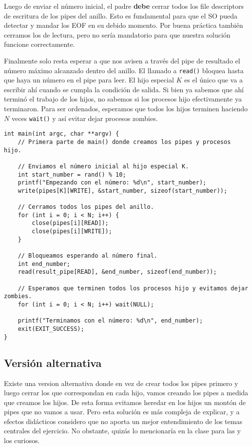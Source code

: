 Luego de enviar el número inicial, el padre \textbf{debe} cerrar todos los file descriptors de escritura de los pipes del anillo. Esto es fundamental para que el SO pueda detectar y mandar los EOF en su debido momento. Por buena práctica también cerramos los de lectura, pero no sería mandatorio para que nuestra solución funcione correctamente.

Finalmente solo resta esperar a que nos avisen a través del pipe de resultado el número máximo alcanzado dentro del anillo. El llamado a \texttt{read()} bloquea hasta que haya un número en el pipe para leer. El hijo especial $K$ es el único que va a escribir ahí cuando se cumpla la condición de salida. Si bien ya sabemos que ahí terminó el trabajo de los hijos, no sabemos si los procesos hijo efectivamente ya terminaron. Para ser ordenados, esperamos que todos los hijos terminen haciendo $N$ veces \texttt{wait()} y así evitar dejar procesos zombies.

\begin{verbatim}
int main(int argc, char **argv) {
    // Primera parte de main() donde creamos los pipes y procesos hijo.

    // Enviamos el número inicial al hijo especial K.
    int start_number = rand() % 10;
    printf("Empezando con el número: %d\n", start_number);
    write(pipes[K][WRITE], &start_number, sizeof(start_number));

    // Cerramos todos los pipes del anillo.
    for (int i = 0; i < N; i++) {
        close(pipes[i][READ]);
        close(pipes[i][WRITE]);
    }

    // Bloqueamos esperando al número final.
    int end_number;
    read(result_pipe[READ], &end_number, sizeof(end_number));

    // Esperamos que terminen todos los procesos hijo y evitamos dejar zombies.
    for (int i = 0; i < N; i++) wait(NULL);

    printf("Terminamos con el número: %d\n", end_number);
    exit(EXIT_SUCCESS);
}
\end{verbatim}

\subsection*{Versión alternativa}

Existe una version alternativa donde en vez de crear todos los pipes primero y luego cerrar los que correspondan en cada hijo, vamos creando los pipes a medida que creamos los hijos. De esta forma evitamos heredar en los hijos un montón de pipes que no vamos a usar. Pero esta solución es más compleja de explicar, y a efectos didácticos considero que no aporta un mejor entendimiento de los temas centrales del ejercicio. No obstante, quizás lo mencionaría en la clase para las y los curiosos.


